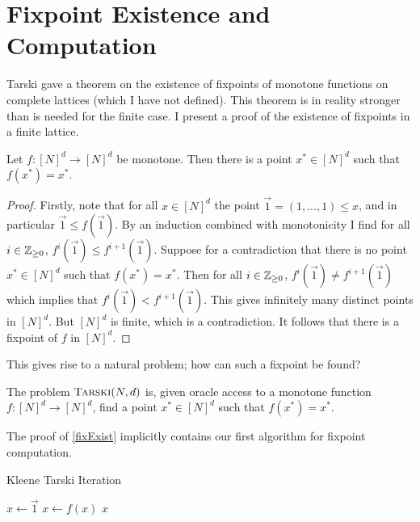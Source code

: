 \section{Fixpoint Existence and Computation}
Tarski gave a theorem on the existence of fixpoints of monotone functions on complete lattices\citep{tarski} (which I have not defined). This theorem
is in reality stronger than is needed for the finite case. I present a proof of the existence of fixpoints in a finite lattice.
\begin{theorem}\label{fixExist}
  Let $f : [N]^d \to [N]^d$ be monotone. Then there is a point $x^* \in [N]^d$ such that $f(x^*) = x^*$.
\end{theorem}
\begin{proof}
  Firstly, note that for all $x \in [N]^d$ the point $\vec{1} = (1, ..., 1) \leq x$, and in particular $\vec{1} \leq f(\vec{1})$.
  By an induction combined with monotonicity I find for all $i \in \mathbb{Z}_{\geq 0}$, $f^i (\vec{1}) \leq f^{i+1} (\vec{1})$. Suppose for a contradiction that there
  is no point $x^* \in [N]^d$ such that $f(x^*) = x^*$. Then for all $i \in \mathbb{Z}_{\geq 0}$, $f^i (\vec{1}) \neq f^{i+1}(\vec{1})$ which implies
  that $f^i (\vec{1}) < f^{i+1}(\vec{1})$. This gives infinitely many distinct points in $[N]^d$. But $[N]^d$ is finite, which is a contradiction.
  It follows that
  there is a fixpoint of $f$ in $[N]^d$.
\end{proof}
This gives rise to a natural problem; how can such a fixpoint be found?
\begin{definition}[$\trsk$]
  The problem $\textsc{Tarski}(N, d)$ is, given oracle access to a monotone function $f : [N]^d \to [N]^d$, find a point $x^* \in [N]^d$ such that $f(x^*) = x^*$.
\end{definition}
The proof of \cref{fixExist} implicitly contains our first algorithm for fixpoint computation.
\begin{algorithm}
  \caption{Kleene Tarski Iteration}
  \begin{algorithmic}
  \State $x \gets \vec{1}$
    \State $x \gets f(x)$
  \EndWhile
  \Return $x$
  \EndProcedure
  \end{algorithmic}
\end{algorithm}

